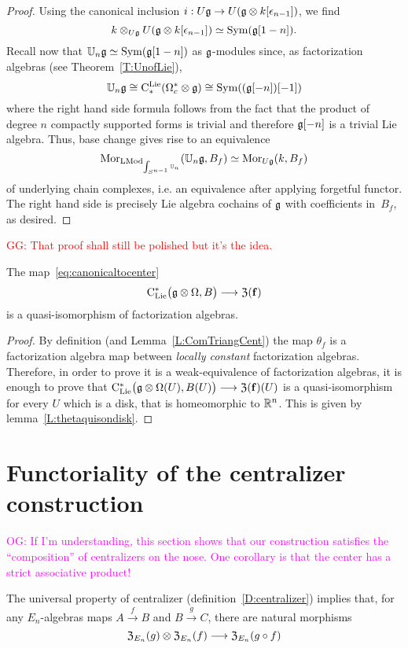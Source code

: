 \documentclass[11pt]{amsart}
\numberwithin{equation}{section}
\def\owen{\textcolor{magenta}{OG: }\textcolor{magenta}}
\def\greg{\textcolor{red}{GG: }\textcolor{red}}
\begin{document}
\begin{proof}
Using the canonical inclusion $i: U\mathfrak g \to U(\mathfrak g \otimes k[\epsilon_{n-1}])$,
we find
\[
k \otimes_{U\mathfrak g} U(\mathfrak g \otimes k[\epsilon_{n-1}]) \simeq {\rm Sym}(\mathfrak g[1-n]).
\]
Recall now that $\mathbb U_n \mathfrak g \simeq {\rm Sym}(\mathfrak g[1-n])$ as $\mathfrak g$-modules 
since, as factorization algebras (see Theorem~\ref{T:UnofLie}),  $$\mathbb U_n \mathfrak g \cong {\rm C}^{\rm Lie}_*(\Omega^*_c \otimes \mathfrak g) \cong {\rm Sym}((\mathfrak g[-n])[-1])$$ where the right hand side formula follows from the fact that the product of degree $n$ compactly supported forms is trivial and therefore $\mathfrak g[-n]$ is a trivial Lie algebra.   
Thus, base change  gives rise to an equivalence 
\[
{\rm Mor}_{{\rm LMod}_{\int_{S^{n-1}} \mathbb U_n}} (\mathbb U_n \mathfrak g, B_f)  \simeq {\rm Mor}_{U\mathfrak g} (k, B_f)
\]
of underlying chain complexes, i.e. an equivalence after applying forgetful functor. The right hand side is precisely Lie algebra cochains of $\mathfrak g$ with coefficients in~$B_f$, as desired.
\end{proof}
\greg{That proof shall still be polished but it's the idea.}

\begin{prp}
\label{L:canonicaltocenterisquis} 
The map~\eqref{eq:canonicaltocenter}
\[
{\rm C}_{\rm Lie}^*\big(\mathfrak g\otimes \Omega , B \big) \longrightarrow  {\frak Z}(\mathbf{f})
\] 
is a quasi-isomorphism of factorization algebras. 
\end{prp}

\begin{proof}
By definition (and Lemma~\ref{L:ComTriangCent}) the map 
$\theta_f$ is a factorization algebra map between \emph{locally constant} factorization algebras. 
Therefore, in order to prove it is a weak-equivalence of factorization algebras, it is enough to prove that 
${\rm C}_{\rm Lie}^*\big(\mathfrak g\otimes \Omega (U), B(U) \big) \longrightarrow  {\frak Z}(\mathbf{f})(U)$ is a quasi-isomorphism for every $U$ which is a disk, that is 
homeomorphic to $\mathbb R^n$. This is given by lemma~\ref{L:thetaquisondisk}.
\end{proof}

\section{Functoriality of the centralizer construction}
\label{S:centerinFacAlg}

\owen{If I'm understanding, this section shows that our construction satisfies the ``composition'' of centralizers on the nose. One corollary is that the center has a strict associative product!}

The universal property of centralizer (definition~\ref{D:centralizer}) implies that, for any $E_n$-algebras maps $A\stackrel{f}\to B$ and
$B\stackrel{g}\to C$, there are natural morphisms
\begin{equation}\label{eqdef:canonicaltocentralizers} {\frak Z}_{E_n}(g) \otimes {\frak Z}_{E_n}(f) \longrightarrow {\frak Z}_{E_n}(g\circ f)
\end{equation}
 
\end{document}
